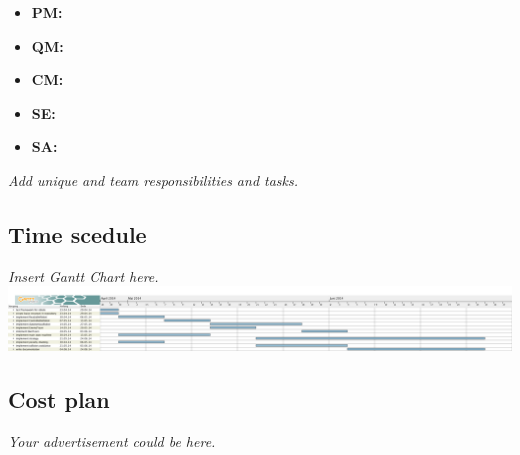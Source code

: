 \documentclass[12pt]{article}
\begin{document}
\begin{itemize}
	\item \textbf{PM:}  
	\item \textbf{QM:} 
	\item \textbf{CM:} 
	\item \textbf{SE:} 
	\item \textbf{SA:} 
\end{itemize}
\textit{Add unique and team responsibilities and tasks.}

\subsection{Time scedule}
\textit{Insert Gantt Chart here.}\\
\includegraphics[width=\textwidth]{../ganttchart.png}

\subsection{Cost plan}
\textit{Your advertisement could be here.}
\end{document}
